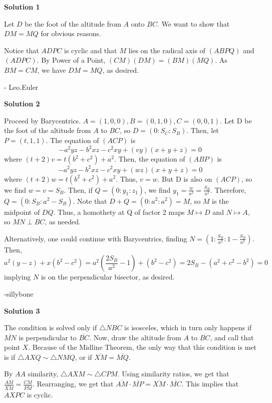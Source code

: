 \begin{enumerate}
 



\textbf{Solution 1}

Let $D$ be the foot of the altitude from $A$ onto $BC$. We want to show that $DM=MQ$ for obvious reasons. 

 Notice that $ADPC$ is cyclic and that $M$ lies on the radical axis of $(ABPQ)$ and $(ADPC)$. By Power of a Point, $(CM)(DM)=(BM)(MQ)$. As $BM=CM$, we have $DM=MQ$, as desired. 

 - Leo.Euler

 



\textbf{Solution 2}

Proceed by Barycentrics. $A=(1, 0, 0), B=(0, 1, 0), C=(0, 0, 1)$. Let D be the foot of the altitude from $A$ to $BC$, so $D=(0:S_C:S_B)$. Then, let $P= (t, 1, 1)$. The equation of $(ACP)$ is 
 \[-a^2yz-b^2xz-c^2xy+(vy)(x+y+z)=0\]where $(t+2)v = t(b^2+c^2)+a^2$. Then, the equation of $(ABP)$ is 
 \[-a^2yz-b^2xz-c^2xy+(wz)(x+y+z)=0\] where $(t+2)w = t(b^2+c^2)+a^2$. Thus, $v=w$. But D is also on $(ACP)$, so we find $w=v=S_B$. Then, if $Q = (0:y_1: z_1)$, we find $y_1 = \frac{w}{a^2} = \frac{S_B}{a^2}$. Therefore, $Q=(0:S_B:a^2-S_B)$. Note that $D+Q=(0:a^2:a^2)=M$, so $M$ is the midpoint of $DQ$. Thus, a homothety at Q of factor 2 maps $M \mapsto D$ and $N\mapsto A$, so $MN \perp BC$, as needed. 

 Alternatively, one could continue with Barycentrics, finding $N=\left(1:\frac{S_B}{a^2}:1-\frac{S_B}{a^2}\right)$. Then, 
 \[a^2(y-z)+x(b^2-c^2) = a^2(\frac{2S_B}{a^2}-1)+(b^2-c^2)=2S_B-(a^2+c^2-b^2)=0\] implying $N$ is on the perpendicular bisector, as desired.

 -sillybone

 



\textbf{Solution 3}

The condition is solved only if $\triangle{NBC}$ is isosceles, which in turn only happens if $\overline{MN}$ is perpendicular to $\overline{BC}$. Now, draw the altitude from $A$ to $\overline{BC}$, and call that point $X$. Because of the Midline Theorem, the only way that this condition is met is if $\triangle{AXQ} \sim \triangle{NMQ}$, or if $\overline{XM}=\overline{MQ}$.

 By $AA$ similarity, $\triangle{AXM} \sim \triangle{CPM}$. Using similarity ratios, we get that $\frac{\overline{AM}}{\overline{XM}}=\frac{\overline{CM}}{\overline{PM}}$. Rearranging, we get that $\overline{AM} \cdot \overline{MP}=\overline{XM} \cdot \overline{MC}$. This implies that $AXPC$ is cyclic.


\end{enumerate}
